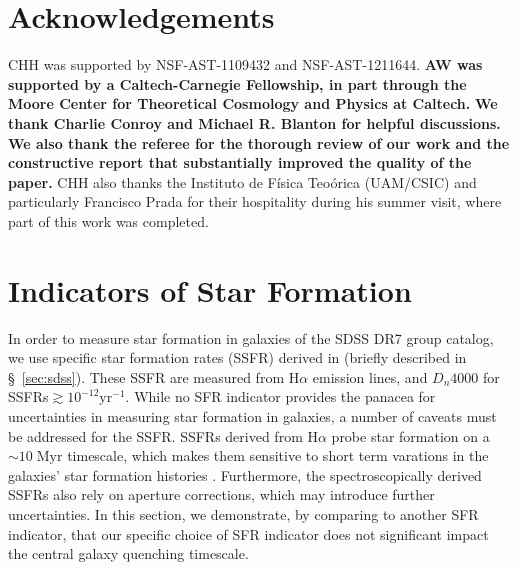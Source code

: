 \documentclass[iop,apj,tighten,twocolappendix,numberedappendix]{emulateapj}
\begin{document}

\section*{Acknowledgements}
CHH was supported by NSF-AST-1109432 and NSF-AST-1211644. 
{\bf \color{dred}
AW was supported by a Caltech-Carnegie Fellowship, in part 
through the Moore Center for Theoretical Cosmology and Physics at Caltech.
}
{\bf \color{dred}
We thank Charlie Conroy and Michael R. Blanton for helpful discussions. 
We also thank the referee for the thorough
review of our work and the constructive report that substantially 
improved the quality of the paper. 
}
CHH also thanks the Instituto  
de F\'{i}sica Teo\'{o}rica (UAM/CSIC) and particularly Francisco 
Prada for their hospitality during his summer visit, where part 
of this work was completed.

\appendix
\section{Indicators of Star Formation} \label{app:sfr}
In order to measure star formation in galaxies of the SDSS DR7 
group catalog, we use specific star formation rates (SSFR) derived
in \cite{Brinchmann:2004aa} (briefly described in \S~\ref{sec:sdss}). 
These SSFR are measured from H$\alpha$ emission lines, and 
$D_n4000$ for SSFRs$\gtrsim 10^{-12}\mathrm{yr}^{-1}$. While no 
SFR indicator provides the panacea for uncertainties in measuring
star formation in galaxies, a number of caveats must be addressed 
for the \cite{Brinchmann:2004aa} SSFR. SSFRs derived from H$\alpha$ 
probe star formation on a $\sim 10\;\mathrm{Myr}$ timescale, which 
makes them sensitive to short term varations in the galaxies' star 
formation histories \citep{Kennicutt:2012aa}. Furthermore, the 
spectroscopically derived \cite{Brinchmann:2004aa} SSFRs also 
rely on aperture corrections, which may introduce further 
uncertainties. In this section, we demonstrate, by comparing to 
another SFR indicator, that our specific choice of SFR indicator 
does not significant impact the central galaxy quenching 
timescale. 
\end{document}
